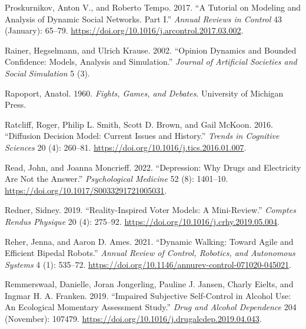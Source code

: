 \documentclass[
  letterpaper,
]{scrbook}
\newlength{\cslhangindent}
\newlength{\cslentryspacingunit} %
\newenvironment{CSLReferences}[2] %
 {%
  \setlength{\parindent}{0pt}
  \ifodd #1
  \let\oldpar\par
  \def\par{\hangindent=\cslhangindent\oldpar}
  \fi
  \setlength{\parskip}{#2\cslentryspacingunit}
 }%
 {}
\begin{document}
\begin{CSLReferences}{1}{0}
\leavevmode{}%
Proskurnikov, Anton V., and Roberto Tempo. 2017. {``A Tutorial on
Modeling and Analysis of Dynamic Social Networks. {Part I}.''}
\emph{Annual Reviews in Control} 43 (January): 65--79.
\url{https://doi.org/10.1016/j.arcontrol.2017.03.002}.

\leavevmode{}%
Rainer, Hegselmann, and Ulrich Krause. 2002. {``Opinion {Dynamics} and
{Bounded Confidence}: {Models}, {Analysis} and {Simulation}.''}
\emph{Journal of Artificial Societies and Social Simulation} 5 (3).

\leavevmode{}%
Rapoport, Anatol. 1960. \emph{Fights, {Games}, and {Debates}}.
{University of Michigan Press}.

\leavevmode{}%
Ratcliff, Roger, Philip L. Smith, Scott D. Brown, and Gail McKoon. 2016.
{``Diffusion {Decision Model}: {Current Issues} and {History}.''}
\emph{Trends in Cognitive Sciences} 20 (4): 260--81.
\url{https://doi.org/10.1016/j.tics.2016.01.007}.

\leavevmode{}%
Read, John, and Joanna Moncrieff. 2022. {``Depression: Why Drugs and
Electricity Are Not the Answer.''} \emph{Psychological Medicine} 52 (8):
1401--10. \url{https://doi.org/10.1017/S0033291721005031}.

\leavevmode{}%
Redner, Sidney. 2019. {``Reality-Inspired Voter Models: {A}
Mini-Review.''} \emph{Comptes Rendus Physique} 20 (4): 275--92.
\url{https://doi.org/10.1016/j.crhy.2019.05.004}.

\leavevmode{}%
Reher, Jenna, and Aaron D. Ames. 2021. {``Dynamic {Walking}: {Toward
Agile} and {Efficient Bipedal Robots}.''} \emph{Annual Review of
Control, Robotics, and Autonomous Systems} 4 (1): 535--72.
\url{https://doi.org/10.1146/annurev-control-071020-045021}.

\leavevmode{}%
Remmerswaal, Danielle, Joran Jongerling, Pauline J. Jansen, Charly
Eielts, and Ingmar H. A. Franken. 2019. {``Impaired Subjective
Self-Control in Alcohol Use: {An} Ecological Momentary Assessment
Study.''} \emph{Drug and Alcohol Dependence} 204 (November): 107479.
\url{https://doi.org/10.1016/j.drugalcdep.2019.04.043}.


\end{CSLReferences}
\end{document}
